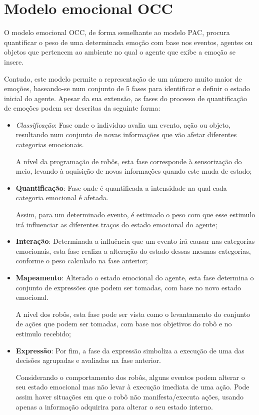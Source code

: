 \section{Modelo emocional OCC}

O modelo emocional OCC, de forma semelhante ao modelo PAC, procura quantificar o peso de uma determinada emoção com base nos eventos, agentes ou objetos que pertencem ao ambiente no qual o agente que exibe a emoção se insere. 

Contudo, este modelo permite a representação de um número muito maior de emoções, baseando-se num conjunto de 5 fases para identificar e definir o estado inicial do agente. 
Apesar da sua extensão, as fases do processo de quantificação de emoções podem ser descritas da seguinte forma:

\begin{itemize}
    \item \textit{Classificação}: Fase onde o individuo avalia um evento, ação ou objeto, resultando num conjunto de novas informações que vão afetar diferentes categorias emocionais. 
    
    A nível da programação de robôs, esta fase corresponde à sensorização do meio, levando à aquisição de novas informações quando este muda de estado;
    
    \item \textbf{Quantificação}: Fase onde é quantificada a intensidade na qual cada categoria emocional é afetada. 
    
    Assim, para um determinado evento, é estimado o peso com que esse estimulo irá influenciar as diferentes traços do estado emocional do agente; 
    
    \item \textbf{Interação}: Determinada a influência que um evento irá causar nas categorias emocionais, esta fase realiza a alteração do estado dessas mesmas categorias, conforme o peso calculado na fase anterior; 
    
    \item \textbf{Mapeamento}: Alterado o estado emocional do agente, esta fase determina o conjunto de expressões que podem ser tomadas, com base no novo estado emocional. 
    
    A nível dos robôs, esta fase pode ser vista como o levantamento do conjunto de ações que podem ser tomadas, com base nos objetivos do robô e no estimulo recebido;
    
    \item \textbf{Expressão}: Por fim, a fase da expressão simboliza a execução de uma das decisões agrupadas e avaliadas na fase anterior. 
    
    Considerando o comportamento dos robôs, alguns eventos podem alterar o seu estado emocional mas não levar à execução imediata de uma ação. 
    Pode assim haver situações em que o robô não manifesta/executa ações, usando apenas a informação adquirira para alterar o seu estado interno. 
    
\end{itemize}

